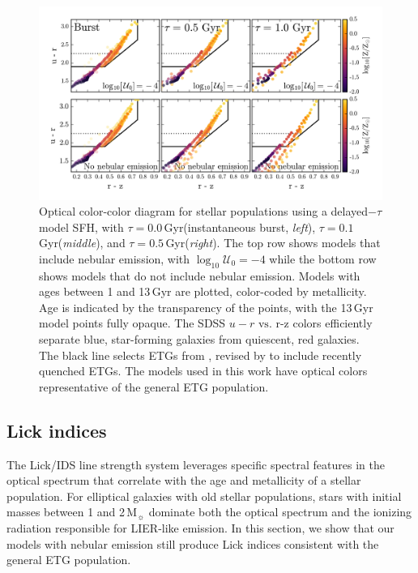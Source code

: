 \documentclass[preprint2]{aastex62}
\newcommand\vs{\ensuremath{\mathrm{vs.}}\xspace}
\newcommand\Msun{\ensuremath{\,\mathrm{M_{\sun}}}\xspace}
\newcommand{\logten}{\ensuremath{\log_{10}}}
\newcommand{\logUeq}[1]{\ensuremath{\logten \mathcal{U}_0 = #1}}
\newcommand{\Gyr}{$\,$Gyr\xspace}
\begin{document}
\begin{figure}
  \begin{center}
    \includegraphics[width=\linewidth]{figs/f9.png}
    \caption{Optical color-color diagram for stellar populations using a delayed$-\tau$ model SFH, with $\tau=0.0$\Gyr (instantaneous burst, \emph{left}), $\tau=0.1$\Gyr (\emph{middle}), and $\tau=0.5$\Gyr (\emph{right}). The top row shows models that include nebular emission, with \logUeq{-4} while the bottom row shows models that do not include nebular emission. Models with ages between 1 and 13\Gyr are plotted, color-coded by metallicity. Age is indicated by the transparency of the points, with the 13\Gyr model points fully opaque. The SDSS $u-r$ \vs r-z colors efficiently separate blue, star-forming galaxies from quiescent, red galaxies. The black line selects ETGs from \citet{Holden+2012}, revised by \citet{McIntosh+2014} to include recently quenched ETGs. The models used in this work have optical colors representative of the general ETG population.}
    \label{fig:optCols}
  \end{center}
\end{figure}

\subsection{Lick indices} \label{sec:stars:continuum:lick}

The Lick/IDS line strength system \citep{Worthey+1994, Trager+2000} leverages specific spectral features in the optical spectrum that correlate with the age and metallicity of a stellar population. For elliptical galaxies with old stellar populations, stars with initial masses between 1 and 2\Msun dominate both the optical spectrum and the ionizing radiation responsible for LIER-like emission. In this section, we show that our models with nebular emission still produce Lick indices consistent with the general ETG population.
\end{document}
